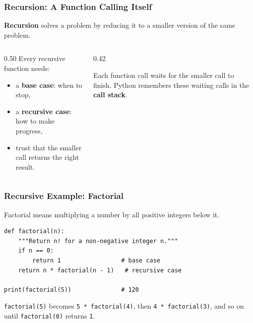\documentclass[aspectratio=169,10pt]{beamer}
\newcommand{\keyword}[1]{\textcolor{PrimaryBlue}{\textbf{#1}}}
\begin{document}
\begin{frame}[fragile]
\frametitle{Recursion: A Function Calling Itself}
\small
\keyword{Recursion} solves a problem by reducing it to a smaller version of the same problem.

\vspace{0.15cm}
\begin{columns}[T,totalwidth=0.96\textwidth]
\begin{column}{0.50\textwidth}
Every recursive function needs:
\begin{itemize}\setlength\itemsep{0.06cm}
  \item a \keyword{base case}: when to stop,
  \item a \keyword{recursive case}: how to make progress,
  \item trust that the smaller call returns the right result.
\end{itemize}
\end{column}
\begin{column}{0.42\textwidth}
\begin{tcolorbox}[lecturebox,title=Call stack idea]
Each function call waits for the smaller call to finish. Python remembers these waiting calls in the \keyword{call stack}.
\end{tcolorbox}
\end{column}
\end{columns}
\end{frame}

\begin{frame}[fragile]
\frametitle{Recursive Example: Factorial}
\small
Factorial means multiplying a number by all positive integers below it.

\vspace{0.1cm}
\begin{lstlisting}[style=pycode]
def factorial(n):
    """Return n! for a non-negative integer n."""
    if n == 0:
        return 1                 # base case
    return n * factorial(n - 1)   # recursive case

print(factorial(5))              # 120
\end{lstlisting}

\begin{tcolorbox}[lecturebox,title=Trace]
\texttt{factorial(5)} becomes \texttt{5 * factorial(4)}, then \texttt{4 * factorial(3)}, and so on until \texttt{factorial(0)} returns \texttt{1}.
\end{tcolorbox}
\end{frame}
\end{document}
